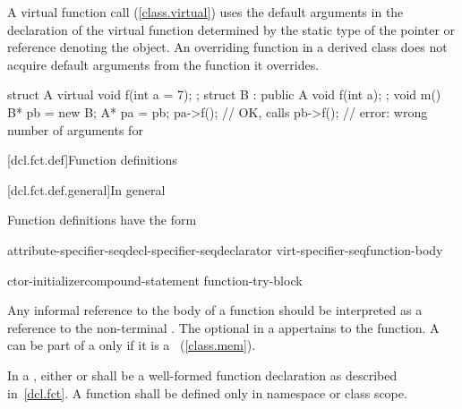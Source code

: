\pnum
{}%
A virtual function call (\ref{class.virtual}) uses the default
arguments in the declaration of the virtual function determined
by the static type of the pointer or reference denoting the
object.
An overriding function in a derived class does not
acquire default arguments from the function it overrides.
\begin{example}

\begin{codeblock}
struct A {
  virtual void f(int a = 7);
};
struct B : public A {
  void f(int a);
};
void m() {
  B* pb = new B;
  A* pa = pb;
  pa->f();          // OK, calls 
  pb->f();          // error: wrong number of arguments for 
}
\end{codeblock}
\end{example}%
%

[dcl.fct.def]{Function definitions}%

[dcl.fct.def.general]{In general}

\pnum
{}%
Function definitions have the form

%
%
\begin{bnf}
\br
    attribute-specifier-seq\opt decl-specifier-seq\opt declarator virt-specifier-seq\opt function-body
\end{bnf}

\begin{bnf}
\br
    ctor-initializer\opt compound-statement\br
    function-try-block\br
    \br
\end{bnf}

Any informal reference to the body of a function should be interpreted as a reference to
the non-terminal .
The optional  in a 
appertains to the function.
A  can be part of a 
only if it is a ~(\ref{class.mem}).

\pnum
In a ,
either   \tcode{;}
or  \tcode{;}
shall be a well-formed function declaration
as described in~\ref{dcl.fct}.
A function shall be defined only in namespace or class scope.

